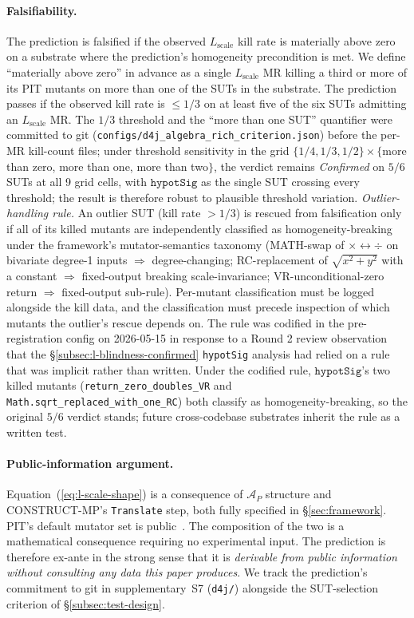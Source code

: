 \documentclass[acmsmall, screen]{acmart}
\begin{document}
\paragraph{Falsifiability.}
The prediction is falsified if the observed
$L_{\mathrm{scale}}$ kill rate is materially above zero on a substrate
where the prediction's homogeneity precondition is met. We define
``materially above zero'' in advance as a single $L_{\mathrm{scale}}$
MR killing a third or more of its PIT mutants on more than one of the
SUTs in the substrate. The prediction passes if the observed kill
rate is $\le 1/3$ on at least five of the six SUTs admitting an
$L_{\mathrm{scale}}$ MR. The $1/3$ threshold and the ``more than one
SUT'' quantifier were committed to git
(\texttt{configs/d4j\_algebra\_rich\_criterion.json}) before the
per-MR kill-count files; under threshold sensitivity in the grid
$\{1/4, 1/3, 1/2\} \times \{$more than zero, more than one, more
than two$\}$, the verdict remains \emph{Confirmed} on $5/6$ SUTs at
all 9 grid cells, with $\texttt{hypotSig}$ as the single SUT
crossing every threshold; the result is therefore robust to
plausible threshold variation. \emph{Outlier-handling rule.} An
outlier SUT (kill rate $> 1/3$) is rescued from falsification only
if all of its killed mutants are independently classified as
homogeneity-breaking under the framework's mutator-semantics
taxonomy (MATH-swap of $\times \leftrightarrow \div$ on bivariate
degree-1 inputs $\Rightarrow$ degree-changing; RC-replacement of
$\sqrt{x^2 + y^2}$ with a constant $\Rightarrow$ fixed-output
breaking scale-invariance; VR-unconditional-zero return
$\Rightarrow$ fixed-output sub-rule). Per-mutant classification
must be logged alongside the kill data, and the classification
must precede inspection of which mutants the outlier's rescue
depends on. The rule was codified in the pre-registration config
on 2026-05-15 in response to a Round 2 review observation that the
\S\ref{subsec:l-blindness-confirmed} \texttt{hypotSig} analysis had
relied on a rule that was implicit rather than written. Under the
codified rule, $\texttt{hypotSig}$'s two killed mutants
(\texttt{return\_zero\_doubles\_VR} and
\texttt{Math.sqrt\_replaced\_with\_one\_RC}) both classify as
homogeneity-breaking, so the original $5/6$ verdict stands; future
cross-codebase substrates inherit the rule as a written test.

\paragraph{Public-information argument.}
Equation~(\ref{eq:l-scale-shape}) is a consequence of $\mathcal{A}_P$
structure and CONSTRUCT-MP's \texttt{Translate} step, both fully
specified in \S\ref{sec:framework}. PIT's default mutator set is
public~\cite{Coles2016PIT}. The composition of the two is a
mathematical consequence requiring no experimental input. The
prediction is therefore ex-ante in the strong sense that it is
\emph{derivable from public information without consulting any data
this paper produces}. We track the prediction's commitment to
git in supplementary~S7 (\texttt{d4j/}) alongside the SUT-selection
criterion of \S\ref{subsec:test-design}.
\end{document}
